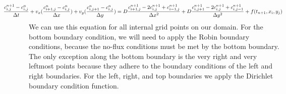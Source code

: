 \documentclass[12pt]{article}
\begin{document}
\begin{equation}
\hspace{-1.7cm}\frac{c_{i,j}^{n+1}-c_{i,j}^n}{\Delta t} + v_x(\frac{c^n_{i+1,j} - c^n_{i,j}}{\Delta x}) + v_y(\frac{c^n_{i,j+1} - c^n_{i,j}}{\Delta y}) = D \frac{c^{n+1}_{i+1,j} - 2c^{n+1}_{i,j}+c^{n+1}_{i-1,j}}{\Delta x^2} + D \frac{c^{n+1}_{i,j+1} - 2c^{n+1}_{i,j}+c^{n+1}_{i,j-1}}{\Delta y^2}+ f(t_{n+1}, x_i, y_j)
\end{equation}
We can use this equation for all internal grid points on our domain. For the bottom boundary condition, we will need to apply the Robin boundary conditions, because the no-flux conditions must be met by the bottom boundary. The only exception along the bottom boundary is the very right and very leftmost points because they adhere to the boundary conditions of the left and right boundaries. For the left, right, and top boundaries we apply the Dirichlet boundary condition function.
\end{document}
